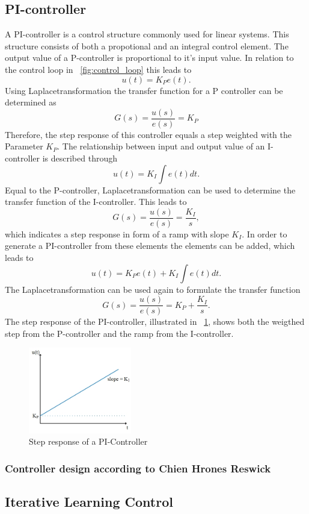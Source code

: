 \subsection{PI-controller}
A PI-controller is a control structure commonly used for linear systems. This structure consists of both a propotional and an integral control element.
The output value of a P-controller is proportional to it's input value. In relation to the control loop in \figurename~\ref{fig:control_loop} this leads to
\begin{equation}
    u(t) = K_{P}e(t).
 \label{eq:p_contr_1}
\end{equation}
Using Laplacetransformation the transfer function for a P controller can be determined as
\begin{equation}
    G(s) = \frac{u(s)}{e(s)} = K_{P}
 \label{eq:p_contr_2}
\end{equation}
Therefore, the step response of this controller equals a step weighted with the Parameter $K_{P}$.
The relationship between input and output value of an I-controller is described through
\begin{equation}
    u(t) = K_{I}\int e(t) dt.
 \label{eq:i_contr_1}
\end{equation}
Equal to the P-controller, Laplacetransformation can be used to determine the transfer function of the I-controller.
This leads to
\begin{equation}
    G(s) = \frac{u(s)}{e(s)} = \frac{K_{I}}{s},
 \label{eq:i_contr_2}
\end{equation}
which indicates a step response in form of a ramp with slope $K_{I}$.
In order to generate a PI-controller from these elements the elements can be added, which leads to
\begin{equation}
    u(t) = K_{P}e(t) + K_{I}\int e(t) dt.
 \label{eq:pi_contr_1}
\end{equation}
The Laplacetransformation can be used again to formulate the transfer function
\begin{equation}
    G(s) = \frac{u(s)}{e(s)} =  K_{P} + \frac{K_{I}}{s}.
 \label{eq:pi_contr_2}
\end{equation}
The step response of the PI-controller, illustrated in \figurename~\ref{fig:step_resp_pi}, shows both the weigthed step from the P-controller and the ramp from the I-controller.

\begin{figure}[h]
   \centering
   \includegraphics[width=0.4\textwidth]{images/step_resp_pi.jpg}
   \caption[Step response of a PI-Controller]{Step response of a PI-Controller}
   \label{fig:step_resp_pi}
 \end{figure}

\subsubsection{Controller design according to Chien Hrones Reswick}

\subsection{Iterative Learning Control}
